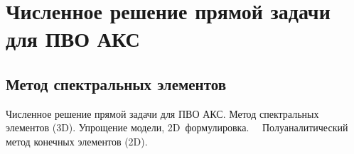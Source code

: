 \chapter{Численное решение прямой задачи для ПВО АКС}\label{ch:ch_my_2}

\section{Метод спектральных элементов}\label{sec:ch_my_2/sec1}

Численное решение прямой задачи для ПВО АКС. Метод спектральных элементов (3D). Упрощение модели, 2D формулировка.   Полуаналитический метод конечных элементов (2D).


